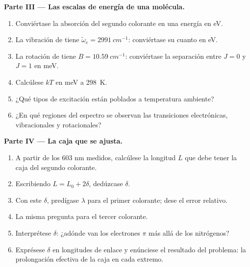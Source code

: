 \begin{problem}
\medskip\noindent\textbf{Parte III --- Las escalas de energía de una molécula.}
\begin{enumerate}[resume]
  \item Conviértase la absorción del segundo colorante en una energía en eV.
  \item La vibración de  tiene $\tilde\omega_e = \qty{2991}{cm^{-1}}$:
        conviértase su cuanto en eV.
  \item La rotación de  tiene $B = \qty{10.59}{cm^{-1}}$: conviértase la
        separación entre $J = 0$ y $J = 1$ en meV.
  \item Calcúlese $kT$ en meV a \qty{298}{K}.
  \item ¿Qué tipos de excitación están poblados a temperatura ambiente?
  \item ¿En qué regiones del espectro se observan las transiciones electrónicas, vibracionales y
        rotacionales?
\end{enumerate}

\medskip\noindent\textbf{Parte IV --- La caja que se ajusta.}
\begin{enumerate}[resume]
  \item A partir de los 603 nm medidos, calcúlese la longitud $L$ que debe tener la caja
        del segundo colorante.
  \item Escribiendo $L = L_0 + 2\delta$, dedúzcase $\delta$.
  \item Con este $\delta$, predígase $\lambda$ para el primer colorante; dese el
        error relativo.
  \item La misma pregunta para el tercer colorante.
  \item Interprétese $\delta$: ¿adónde van los electrones $\pi$ más allá de los
        nitrógenos?
  \item Exprésese $\delta$ en longitudes de enlace y enúnciese el resultado del
        problema: la prolongación efectiva de la caja en cada extremo.
\end{enumerate}
\end{problem}

